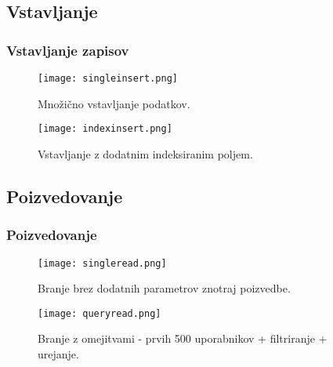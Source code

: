 \documentclass{beamer}
\begin{document}
    \subsection{Vstavljanje}
    \begin{frame}
    \frametitle{Vstavljanje zapisov}
    \begin{figure}
        \begin{minipage}[t]{0.45\textwidth}
            \centering
            \texttt{[image: singleinsert.png]}
            \caption*{Množično vstavljanje podatkov.}
        \end{minipage}
        \hfill
        \begin{minipage}[t]{0.45\textwidth}
            \centering
            \texttt{[image: indexinsert.png]}
            \caption*{Vstavljanje z dodatnim indeksiranim poljem.}
        \end{minipage}
    \end{figure}
\end{frame}

    \subsection{Poizvedovanje}
    \begin{frame}
        \frametitle{Poizvedovanje}
        \begin{figure}
            \begin{minipage}[t]{0.45\textwidth}
                \centering
                \texttt{[image: singleread.png]}
                \caption*{Branje brez dodatnih parametrov znotraj poizvedbe.}
            \end{minipage}
            \hfill
            \begin{minipage}[t]{0.45\textwidth}
                \centering
                \texttt{[image: queryread.png]}
                \caption*{Branje z omejitvami - prvih 500 uporabnikov + filtriranje + urejanje.}
            \end{minipage}
        \end{figure}
    \end{frame}
\end{document}

